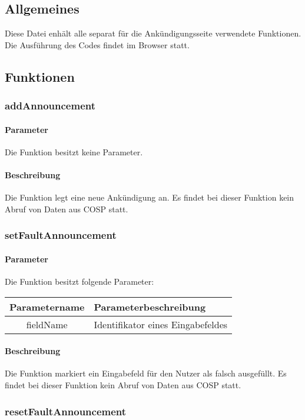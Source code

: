 \subsection{Allgemeines} Diese Datei enhält alle separat für die Ankündigungsseite verwendete Funktionen.
Die Ausführung des Codes findet im Browser statt.
\subsection{Funktionen}
\subsubsection{addAnnouncement}
\paragraph{Parameter} Die Funktion besitzt keine Parameter.
\paragraph{Beschreibung} Die Funktion legt eine neue Ankündigung an. Es findet bei dieser Funktion kein Abruf von Daten aus {\glqq COSP\grqq} statt.
\subsubsection{setFaultAnnouncement}
\paragraph{Parameter} Die Funktion besitzt folgende Parameter:
\begin{table}[H]
	\begin{tabular}{|c|p{11cm}|}
		\hline
		\textbf{Parametername} & \textbf{Parameterbeschreibung} \\ \hline
		fieldName & Identifikator eines Eingabefeldes \\ \hline
	\end{tabular}
\end{table}
\paragraph{Beschreibung} Die Funktion markiert ein Eingabefeld für den Nutzer als falsch ausgefüllt. Es findet bei dieser Funktion kein Abruf von Daten aus {\glqq COSP\grqq} statt.
\subsubsection{resetFaultAnnouncement}
